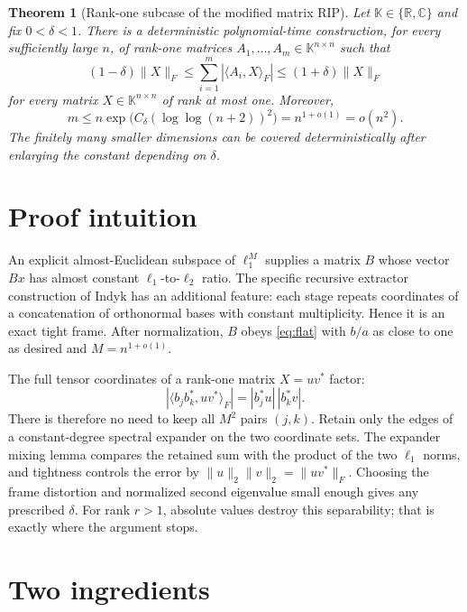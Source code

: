 \documentclass[11pt]{article}
\newtheorem{theorem}{Theorem}
\newcommand{\K}{\mathbb K}
\newcommand{\R}{\mathbb R}
\newcommand{\C}{\mathbb C}
\newcommand{\ip}[2]{\langle #1,#2\rangle}
\begin{document}
\begin{theorem}[Rank-one subcase of the modified matrix RIP]\label{thm:main}
Let $\K\in\{\R,\C\}$ and fix $0<\delta<1$.  There is a deterministic
polynomial-time construction, for every sufficiently large $n$, of rank-one
matrices $A_1,\dots,A_m\in\K^{n\times n}$ such that
\begin{equation}\label{eq:main-rip}
 (1-\delta)\|X\|_F
 \leq \sum_{i=1}^m |\ip{A_i}{X}_F|
 \leq (1+\delta)\|X\|_F
\end{equation}
for every matrix $X\in\K^{n\times n}$ of rank at most one.  Moreover,
\begin{equation}\label{eq:m-bound}
 m\leq n\exp\!\bigl(C_\delta(\log\log(n+2))^2\bigr)
      =n^{1+o(1)}=o(n^2).
\end{equation}
The finitely many smaller dimensions can be covered deterministically after
enlarging the constant depending on $\delta$.
\end{theorem}

\section{Proof intuition}

An explicit almost-Euclidean subspace of $\ell_1^M$ supplies a matrix $B$
whose vector $Bx$ has almost constant $\ell_1$-to-$\ell_2$ ratio.  The
specific recursive extractor construction of Indyk has an additional feature:
each stage repeats coordinates of a concatenation of orthonormal bases with
constant multiplicity.  Hence it is an exact tight frame.  After normalization,
$B$ obeys \eqref{eq:flat} with $b/a$ as close to one as desired and
$M=n^{1+o(1)}$.

The full tensor coordinates of a rank-one matrix $X=uv^*$ factor:
\[
  |\ip{b_jb_k^*}{uv^*}_F|
       =|b_j^*u|\,|b_k^*v|.
\]
There is therefore no need to keep all $M^2$ pairs $(j,k)$.  Retain only the
edges of a constant-degree spectral expander on the two coordinate sets.
The expander mixing lemma compares the retained sum with the product of the
two $\ell_1$ norms, and tightness controls the error by
$\|u\|_2\|v\|_2=\|uv^*\|_F$.  Choosing the frame distortion and normalized
second eigenvalue small enough gives any prescribed $\delta$.  For rank
$r>1$, absolute values destroy this separability; that is exactly where the
argument stops.

\section{Two ingredients}
\end{document}
